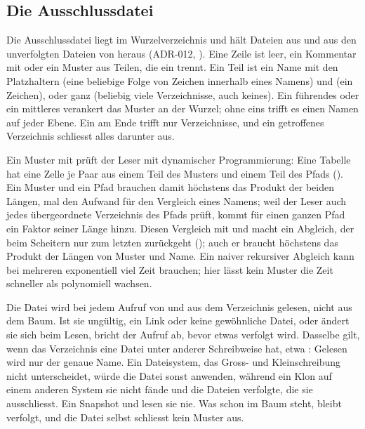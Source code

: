 \subsection[sec:exclusion-file]{Die Ausschlussdatei}

Die Ausschlussdatei  liegt im Wurzelverzeichnis
und hält Dateien aus  und aus den unverfolgten Dateien von  heraus
(ADR-012, ).
Eine Zeile ist leer, ein Kommentar mit \type{#} oder ein Muster aus Teilen, die ein \type{/} trennt.
Ein Teil ist ein Name mit den Platzhaltern \type{*} (eine beliebige Folge von Zeichen
innerhalb eines Namens) und  (ein Zeichen),
oder ganz \type{**} (beliebig viele Verzeichnisse, auch keines).
Ein führendes oder ein mittleres \type{/} verankert das Muster an der Wurzel;
ohne eins trifft es einen Namen auf jeder Ebene.
Ein \type{/} am Ende trifft nur Verzeichnisse,
und ein getroffenes Verzeichnis schliesst alles darunter aus.

Ein Muster mit \type{**} prüft der Leser mit dynamischer Programmierung:
Eine Tabelle hat eine Zelle je Paar aus einem Teil des Musters und einem Teil des Pfads
().
Ein Muster und ein Pfad brauchen damit höchstens das Produkt der beiden Längen,
mal den Aufwand für den Vergleich eines Namens;
weil der Leser auch jedes übergeordnete Verzeichnis des Pfads prüft,
kommt für einen ganzen Pfad ein Faktor seiner Länge hinzu.
Diesen Vergleich mit \type{*} und  macht ein Abgleich, der beim Scheitern nur zum
letzten \type{*} zurückgeht ();
auch er braucht höchstens das Produkt der Längen von Muster und Name.
Ein naiver rekursiver Abgleich kann bei mehreren \type{**} exponentiell viel Zeit brauchen;
hier lässt kein Muster die Zeit schneller als polynomiell wachsen.

Die Datei wird bei jedem Aufruf von  und  aus dem Verzeichnis gelesen,
nicht aus dem Baum.
Ist sie ungültig, ein Link oder keine gewöhnliche Datei, oder ändert sie sich beim Lesen,
bricht der Aufruf ab, bevor etwas verfolgt wird.
Dasselbe gilt, wenn das Verzeichnis eine Datei unter anderer Schreibweise hat, etwa
: Gelesen wird nur der genaue Name.
Ein Dateisystem, das Gross- und Kleinschreibung nicht unterscheidet, würde die Datei sonst
anwenden, während ein Klon auf einem anderen System sie nicht fände
und die Dateien verfolgte, die sie ausschliesst.
Ein Snapshot und  lesen sie nie.
Was schon im Baum steht, bleibt verfolgt, und die Datei selbst schliesst kein Muster aus.

